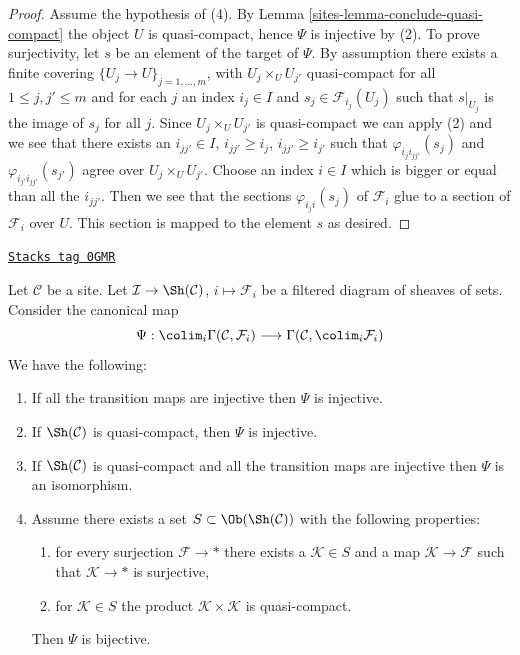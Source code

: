 \begin{proof}
\medskip\noindent
Assume the hypothesis of (4). By Lemma \ref{sites-lemma-conclude-quasi-compact}
the object $U$ is quasi-compact, hence $\Psi$ is injective by (2).
To prove surjectivity, let $s$ be an element of the target of $\Psi$.
By assumption there  exists a finite covering
$\{U_j \to U\}_{j = 1, \ldots, m}$, with $U_j \times_U U_{j'}$
quasi-compact for all $1 \leq j, j' \leq m$ and
for each $j$ an index $i_j \in I$ and $s_j \in \mathcal{F}_{i_j}(U_j)$
such that $s|_{U_j}$ is the image of $s_j$ for all $j$.
Since $U_j \times_U U_{j'}$ is quasi-compact we can apply (2)
and we see that there exists an $i_{jj'} \in I$,
$i_{jj'} \geq i_j$, $i_{jj'} \geq i_{j'}$ such that
$\varphi_{i_ji_{jj'}}(s_j)$ and $\varphi_{i_{j'}i_{jj'}}(s_{j'})$
agree over $U_j \times_U U_{j'}$. Choose an index $i \in I$
which is bigger or equal than all the $i_{jj'}$. Then we see that
the sections $\varphi_{i_ji}(s_j)$ of $\mathcal{F}_i$ glue
to a section of $\mathcal{F}_i$ over $U$. This section is mapped
to the element $s$ as desired.
\end{proof}

\begin{lemma}
\label{sites-lemma-directed-colimits-global-sections}
\href{https://stacks.math.columbia.edu/tag/0GMR}{\texttt{Stacks tag 0GMR}}

Let $\mathcal{C}$ be a site. Let
$\mathcal{I} \to \Sh(\mathcal{C})$, $i \mapsto \mathcal{F}_i$
be a filtered diagram of sheaves of sets.
Consider the canonical map
$$
\Psi :
\colim_i \Gamma(\mathcal{C}, \mathcal{F}_i)
\longrightarrow
\Gamma(\mathcal{C}, \colim_i \mathcal{F}_i)
$$
We have the following:
\begin{enumerate}
\item If all the transition maps are injective then $\Psi$ is injective.
\item If $\Sh(\mathcal{C})$ is quasi-compact, then $\Psi$ is injective.
\item If $\Sh(\mathcal{C})$ is quasi-compact and all the transition maps
are injective then $\Psi$ is an isomorphism.
\item Assume there exists a set $S \subset \Ob(\Sh(\mathcal{C}))$
with the following properties:
\begin{enumerate}
\item for every surjection $\mathcal{F} \to *$ there exists a
$\mathcal{K} \in S$ and a map $\mathcal{K} \to \mathcal{F}$
such that $\mathcal{K} \to *$ is surjective,
\item for $\mathcal{K} \in S$ the product
$\mathcal{K} \times \mathcal{K}$ is quasi-compact.
\end{enumerate}
Then $\Psi$ is bijective.
\end{enumerate}
\end{lemma}

